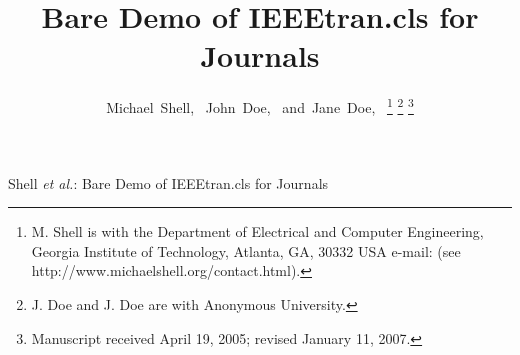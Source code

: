 \documentclass[journal]{IEEEtran}
\begin{document}
%
\title{Bare Demo of IEEEtran.cls for Journals}
%
%
%

\author{Michael~Shell,~
        John~Doe,~
        and~Jane~Doe,~%
\thanks{M. Shell is with the Department
of Electrical and Computer Engineering, Georgia Institute of Technology, Atlanta,
GA, 30332 USA e-mail: (see http://www.michaelshell.org/contact.html).}%
\thanks{J. Doe and J. Doe are with Anonymous University.}%
\thanks{Manuscript received April 19, 2005; revised January 11, 2007.}}

%
%



%
{Shell \MakeLowercase{\textit{et al.}}: Bare Demo of IEEEtran.cls for Journals}
%
\end{document}
